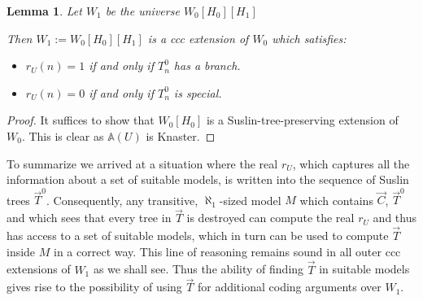\documentclass[a4paper,11pt]{article}
\newtheorem{lemma}[theorem]{Lemma}
\begin{document}
\begin{lemma}
 Let $W_1$ be the universe $W_0[H_0][H_1]$

 Then
 $W_1:= W_0[H_0][H_1]$ is a ccc extension of $W_0$ which satisfies:
 \begin{itemize}
 \item $ r_U(n)=1$ if and only if $T^{0}_n$ has a branch.
 \item $ r_U(n)=0$ if and only if $T^{0}_n$ is special.
\end{itemize}
\end{lemma}

\begin{proof}
It suffices to show that $W_0[H_0]$ is a Suslin-tree-preserving extension of $W_0$. This is clear as $\mathbb{A}(U)$ is Knaster. 

\end{proof}
To summarize we arrived at a situation where the real $r_U$, which captures all the information about a set of suitable models, is written into the sequence of Suslin trees $\vec{T}^0$. Consequently, any transitive, $\aleph_1$-sized model  $M$ which contains $\vec{C}$, $\vec{T}^0$ and which sees that every tree in $\vec{T}$ is destroyed can compute the real $r_U$ and thus has access to a set of suitable models, which in turn can be used to compute $\vec{T}$ inside $M$ in a correct way. This line of reasoning remains sound in all outer ccc extensions of $W_1$ as we shall see. Thus the ability of finding $\vec{T}$ in suitable models gives rise to the possibility of using $\vec{T}$ for additional coding arguments over $W_1$.
\end{document}
